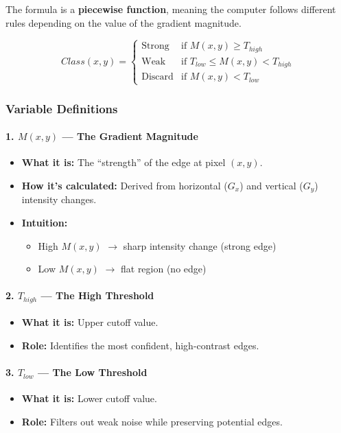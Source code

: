 \documentclass[12pt]{article}
\begin{document}
The formula is a \textbf{piecewise function}, meaning the computer follows different rules depending on the value of the gradient magnitude.

\[
    Class(x,y)=
    \begin{cases}
        \text{Strong}  & \text{if } M(x,y)\ge T_{high}            \\
        \text{Weak}    & \text{if } T_{low} \le M(x,y) < T_{high} \\
        \text{Discard} & \text{if } M(x,y) < T_{low}
    \end{cases}
\]

\subsubsection*{Variable Definitions}

\paragraph{1. $M(x,y)$ — The Gradient Magnitude}
\begin{itemize}
    \item \textbf{What it is:} The ``strength'' of the edge at pixel $(x,y)$.
    \item \textbf{How it's calculated:} Derived from horizontal ($G_x$) and vertical ($G_y$) intensity changes.
    \item \textbf{Intuition:}
          \begin{itemize}
              \item High $M(x,y)$ $\rightarrow$ sharp intensity change (strong edge)
              \item Low $M(x,y)$ $\rightarrow$ flat region (no edge)
          \end{itemize}
\end{itemize}

\paragraph{2. $T_{high}$ — The High Threshold}
\begin{itemize}
    \item \textbf{What it is:} Upper cutoff value.
    \item \textbf{Role:} Identifies the most confident, high-contrast edges.
\end{itemize}

\paragraph{3. $T_{low}$ — The Low Threshold}
\begin{itemize}
    \item \textbf{What it is:} Lower cutoff value.
    \item \textbf{Role:} Filters out weak noise while preserving potential edges.
\end{itemize}
\end{document}
